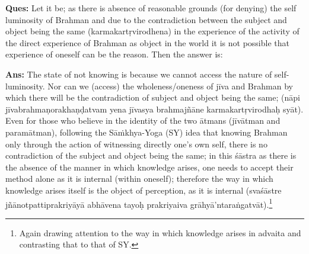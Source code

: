 \textbf{Ques:} Let it be; as there is absence of reasonable grounds (for denying) the self luminosity of Brahman and due to the contradiction between the subject and object being the same (karmakartṛvirodhena) in the experience of the activity of the direct experience of Brahman as object in the world it is not possible that experience of oneself can be the reason. Then the answer is: 

\textbf{Ans:} The state of not knowing is because we cannot access the nature of self-luminosity. Nor can we (access) the wholeness/oneness of jīva and Brahman by which there will be the contradiction of subject and object being the same;  (nāpi jīvabrahmaṇorakhaṇḍatvam yena jīvasya brahmajñāne karmakartṛvirodhaḥ syāt). Even for those who believe in the identity of the two ātmans (jīvātman and paramātman), following the Sāṁkhya-Yoga (SY) idea that  knowing Brahman only through the action of witnessing directly one’s own self, there is no contradiction of the subject and object being the same; in this śāstra as there is the absence of the manner in which knowledge arises, one needs to accept their method alone as it is internal (within oneself); therefore the way in which knowledge arises itself is the object of perception, as it is internal (svaśāstre jñānotpattiprakriyāyā abhāvena tayoḥ prakriyaiva grāhyā’ntaraṅgatvāt).\footnote{Again drawing attention to the way in which knowledge arises in advaita and contrasting that to that of SY.}


